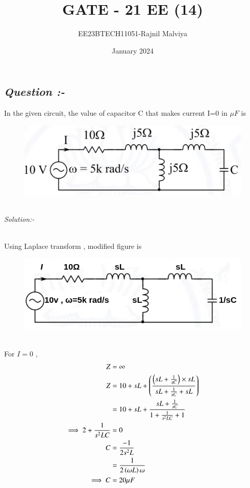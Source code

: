 \documentclass[journal,12pt,twocolumn]{IEEEtran}
\theoremstyle{remark}
\begin{document}
\title{GATE - 21 EE (14)}
\author{EE23BTECH11051-Rajnil Malviya}
\date{January 2024}
\maketitle
\subsection*{\textit{Question :-}}
In the given circuit, the value of capacitor C that makes current
I=0 in $\mu F$ is \\
\begin{figure}[h!]
   \includegraphics[width=1\linewidth]{figs/qf1.png}
\end{figure}\\
\textit{Solution:- }
\begin{table}[h!]
            
    \end{table}\\
Using Laplace transform , modified figure is 
\begin{figure}[h!]
   \includegraphics[width=1\linewidth]{figs/f2.png}
\end{figure}\\
For $I=0 $ , 
\begin{align}
Z & =\infty\\
    Z&=10+sL+\left(\frac{\left(sL+\frac{1}{sC}\right)\times sL}{sL+\frac{1}{sC}+ sL}\right)\\
&=10+sL+\frac{sL+\frac{1}{sC}}{1+\frac{1}{s^{2}LC}+1}\\
 \implies   2+\frac{1}{s^{2}LC}&=0 \\
     C&=\frac{-1}{2s^2L}\\
       &=\frac{1}{2\left(\omega L\right)\omega }\\
       \implies C&= 20\mu F
\end{align}
\end{document}
